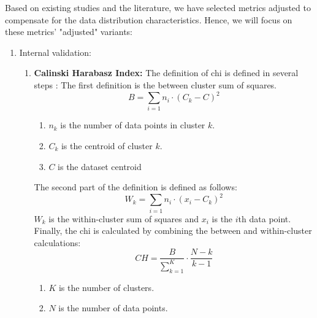 Based on existing studies and the literature, we have selected metrics adjusted to compensate for the data distribution characteristics.
Hence, we will focus on these metrics' "adjusted" variants:
\begin{enumerate}
  \item Internal validation:
        \begin{enumerate}
          \item \textbf{Calinski Harabasz Index:}
                The definition of \gls{chi} is defined in several steps \citep{liu_understanding_2010}:
                The first definition is the between cluster sum of squares.
                \begin{equation}
                  B = \sum_{i=1} n_i \cdot (C_k - C)^2
                \end{equation}
                \begin{enumerate}
                  \item $n_k$ is the number of data points in cluster $k$.
                  \item $C_k$ is the centroid of cluster $k$.
                  \item $C$ is the dataset centroid
                \end{enumerate}
                The second part of the definition is defined as follows:
                \begin{equation}
                  W_k = \sum_{i=1}n_i \cdot (x_i - C_k)^2
                \end{equation}
                $W_k$ is the within-cluster sum of squares and $x_i$ is the $i$th data point.
                Finally, the \gls{chi} is calculated by combining the between and within-cluster calculations:
                \begin{equation}
                  CH = \frac{B}{\sum_{k=1}^{K}} \cdot \frac{N - k}{k - 1}
                \end{equation}
                \begin{enumerate}
                  \item $K$ is the number of clusters.
                  \item $N$ is the number of data points.
                \end{enumerate}


\end{enumerate}
\end{enumerate}
